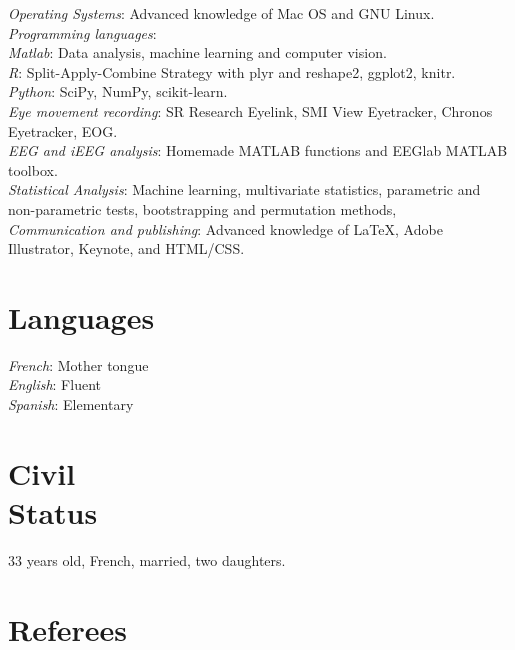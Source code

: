 \documentclass[margin,line]{resume}
\begin{document}
\begin{resume}
	\textsl{Operating Systems}: Advanced knowledge of Mac OS and GNU Linux.\\
	\textsl{Programming languages}: \\
		\phantom{1em} \textsl{Matlab}: Data analysis, machine learning and computer vision.\\
		\phantom{1em} \textsl{R}: Split-Apply-Combine Strategy with plyr and reshape2, ggplot2, knitr.\\
		\phantom{1em} \textsl{Python}: SciPy, NumPy, scikit-learn.\\
	\textsl{Eye movement recording}: SR Research Eyelink, SMI View Eyetracker, Chronos Eyetracker, EOG.\\
	\textsl{EEG and iEEG analysis}: Homemade MATLAB functions and EEGlab MATLAB toolbox.\\
	\textsl{Statistical Analysis}: Machine learning, multivariate statistics, parametric and non-parametric tests, bootstrapping and permutation methods, \\
	\textsl{Communication and publishing}: Advanced knowledge of \LaTeX, Adobe Illustrator, Keynote, and HTML/CSS.





\vspace{3mm}
    \section{\mysidestyle Languages}
	\textsl{French}: Mother tongue\\
	\textsl{English}: Fluent\\
	\textsl{Spanish}: Elementary

    \section{\mysidestyle Civil\\Status}
    33 years old, French, married, two daughters.	

\vspace{3mm}	
	\section{\mysidestyle Referees} 


\end{resume}
\end{document}
